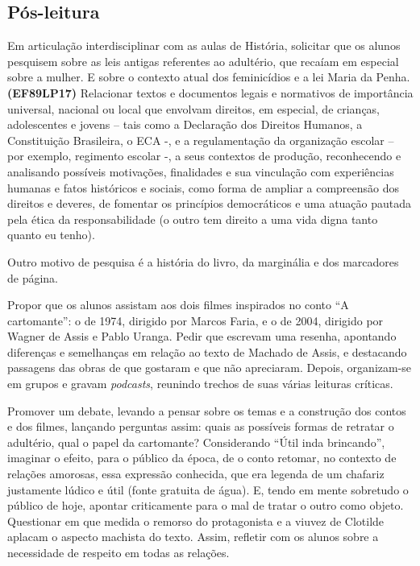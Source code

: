 \subsection{Pós-leitura}

Em articulação interdisciplinar com as aulas de História, solicitar que
os alunos pesquisem sobre as leis antigas referentes ao adultério, que
recaíam em especial sobre a mulher. E sobre o contexto atual dos
feminicídios e a lei Maria da Penha. \textbf{(EF89LP17)} Relacionar textos e documentos legais e normativos de importância universal, nacional ou local que envolvam direitos, em especial, de crianças, adolescentes e jovens – tais como a Declaração dos Direitos Humanos, a Constituição Brasileira, o ECA -, e a regulamentação da organização escolar – por exemplo, regimento escolar -, a seus contextos de produção, reconhecendo e analisando possíveis motivações, finalidades e sua vinculação com experiências humanas e fatos históricos e sociais, como forma de ampliar a compreensão dos direitos e deveres, de fomentar os princípios democráticos e uma atuação pautada pela ética da responsabilidade (o outro tem direito a uma vida digna tanto quanto eu tenho). 

Outro motivo de pesquisa é a história do livro, da marginália e dos
marcadores de página.

Propor que os alunos assistam aos dois filmes inspirados no conto ``A
cartomante'': o de 1974, dirigido por Marcos Faria, e o de 2004,
dirigido por Wagner de Assis e Pablo Uranga. Pedir que escrevam uma
resenha, apontando diferenças e semelhanças em relação ao texto de
Machado de Assis, e destacando passagens das obras de que gostaram e que
não apreciaram. Depois, organizam-se em grupos e gravam \emph{podcasts},
reunindo trechos de suas várias leituras críticas. 

Promover um debate, levando a pensar sobre os temas e a construção dos
contos e dos filmes, lançando perguntas assim: quais as possíveis formas
de retratar o adultério, qual o papel da cartomante? Considerando ``Útil
inda brincando'', imaginar o efeito, para o público da época, de o conto
retomar, no contexto de relações amorosas, essa expressão conhecida, que
era legenda de um chafariz justamente lúdico e útil (fonte gratuita de
água). E, tendo em mente sobretudo o público de hoje, apontar
criticamente para o mal de tratar o outro como objeto. Questionar em que
medida o remorso do protagonista e a viuvez de Clotilde aplacam o
aspecto machista do texto. Assim, refletir com os alunos sobre a
necessidade de respeito em todas as relações.

